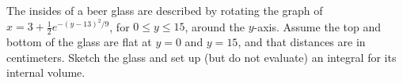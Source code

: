 The insides of a beer glass are described by rotating the graph of $x=3 + \frac{1}{2} e^{-(y-13)^2/9}$, for $0 \le y \le 15$, around the $y$-axis.  Assume the top and bottom of the glass are flat at $y=0$ and $y=15$, and that distances are in centimeters.  Sketch the glass and set up (but do not evaluate) an integral for its internal volume.
